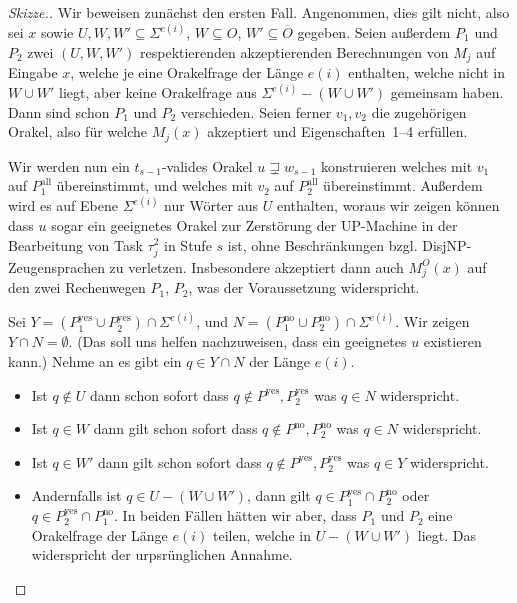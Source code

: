 \documentclass[nofonts]{uebung}
\begin{document}
\begin{proof}[Skizze.]
    Wir beweisen zunächst den ersten Fall.
    Angenommen, dies gilt nicht, also sei $x$ sowie $U,W,W'\subseteq \Sigma^{e(i)}$, $W\subseteq O$, $W'\subseteq\overline{O}$ gegeben.
    Seien außerdem $P_1$ und $P_2$ zwei $(U, W, W')$ respektierenden akzeptierenden Berechnungen von $M_j$ auf Eingabe $x$,
    welche je eine Orakelfrage der Länge $e(i)$ enthalten, welche nicht in $W\cup W'$ liegt,
    aber keine Orakelfrage aus $\Sigma^{e(i)}-(W\cup W')$ gemeinsam haben.
    Dann sind schon $P_1$ und $P_2$ verschieden.
    Seien ferner $v_1, v_2$ die zugehörigen Orakel, also für welche $M_j(x)$ akzeptiert und Eigenschaften~1--4 erfüllen.

    Wir werden nun ein $t_{s-1}$-valides Orakel $u\sqsupsetneq w_{s-1}$ konstruieren welches mit $v_1$ auf $P^\mathrm{all}_1$ übereinstimmt, und welches mit $v_2$ auf $P^\mathrm{all}_2$ übereinstimmt.
    Außerdem wird es auf Ebene $\Sigma^{e(i)}$ nur Wörter aus $U$ enthalten, woraus wir zeigen können dass $u$ sogar ein geeignetes Orakel zur Zerstörung der UP-Machine in der Bearbeitung von Task $\tau^2_{j}$ in Stufe $s$ ist, ohne Beschränkungen bzgl. DisjNP-Zeugensprachen zu verletzen. Insbesondere akzeptiert dann auch $M_j^O(x)$ auf den zwei Rechenwegen $P_1$, $P_2$, was der Voraussetzung widerspricht.

    Sei $Y=(P^\mathrm{yes}_1\cup P^\mathrm{yes}_2)\cap\Sigma^{e(i)}$, und $N=(P^\mathrm{no}_1\cup P^\mathrm{no}_2)\cap\Sigma^{e(i)}$.
    Wir zeigen $Y\cap N = \emptyset$. (Das soll uns helfen nachzuweisen, dass ein geeignetes $u$ existieren kann.)
    Nehme an es gibt ein $q\in Y\cap N$ der Länge $e(i)$.
    \begin{itemize}[noitemsep]
        \item Ist $q\not\in U$ dann schon sofort dass $q\not\in P^\mathrm{yes}, P^\mathrm{yes}_2$ was $q\in N$ widerspricht.
        \item Ist $q\in W$ dann gilt schon sofort dass $q\not\in P^\mathrm{no}, P^\mathrm{no}_2$ was $q\in N$ widerspricht.
        \item Ist $q\in W'$ dann gilt schon sofort dass $q\not\in P^\mathrm{yes}, P^\mathrm{yes}_2$ was $q\in Y$ widerspricht.
        \item Andernfalls ist $q\in U-( W\cup W')$, dann gilt $q\in P^\mathrm{yes}_1\cap P^\mathrm{no}_2$ oder $q\in P^\mathrm{yes}_2\cap P^\mathrm{no}_1$.
            In beiden Fällen hätten wir aber, dass $P_1$ und $P_2$ eine Orakelfrage der Länge $e(i)$ teilen, welche in $U-(W\cup W')$ liegt. Das widerspricht der urpsrünglichen Annahme.
    \end{itemize}


\end{proof}
\end{document}
